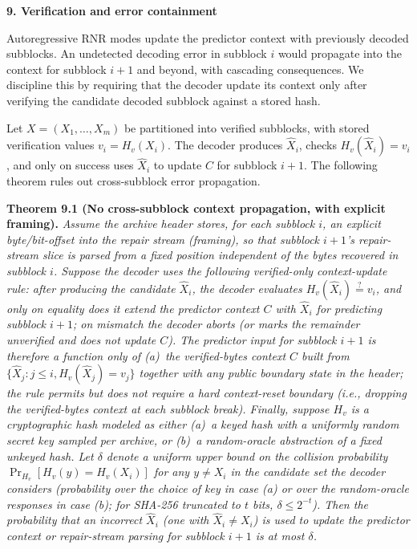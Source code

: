 \documentclass[
]{article}
\begin{document}
\textbf{9. Verification and error containment}

Autoregressive RNR modes update the predictor context with previously
decoded subblocks. An undetected decoding error in subblock $i$ would
propagate into the context for subblock $i + 1$ and beyond, with
cascading consequences. We discipline this by requiring that the
decoder update its context only after verifying the candidate decoded
subblock against a stored hash.

Let $X = (X_1, \ldots, X_m)$ be partitioned into verified subblocks,
with stored verification values $v_i = H_v(X_i)$. The decoder produces
$\hat{X}_i$, checks $H_v(\hat{X}_i) = v_i$, and only on success uses
$\hat{X}_i$ to update $C$ for subblock $i + 1$. The following theorem
rules out cross-subblock error propagation.

\textbf{Theorem 9.1 (No cross-subblock context propagation, with
explicit framing).} \emph{Assume the archive header stores, for each
subblock $i$, an explicit byte/bit-offset into the repair stream
(framing), so that subblock $i + 1$'s repair-stream slice is parsed
from a fixed position independent of the bytes recovered in
subblock $i$. Suppose the decoder uses the following
\emph{verified-only context-update rule}: after producing the
candidate $\hat{X}_i$, the decoder evaluates
$H_v(\hat{X}_i) \stackrel{?}{=} v_i$, and only on equality does it
extend the predictor context $C$ with $\hat{X}_i$ for predicting
subblock $i + 1$; on mismatch the decoder aborts (or marks the
remainder unverified and does not update $C$). The predictor input
for subblock $i+1$ is therefore a function only of (a)~the
verified-bytes context $C$ built from $\{\hat{X}_j : j \leq i,
H_v(\hat{X}_j) = v_j\}$ together with any public boundary state in
the header; the rule permits but does not require a hard
\emph{context-reset boundary} (i.e., dropping the verified-bytes
context at each subblock break). Finally, suppose $H_v$ is a
cryptographic hash modeled as either (a)~a keyed hash with a
uniformly random secret key sampled per archive, or
(b)~a random-oracle abstraction of a fixed unkeyed hash. Let
$\delta$ denote a uniform upper bound on the collision probability
$\Pr_{H_v}[H_v(y) = H_v(X_i)]$ for any $y \neq X_i$ in the
candidate set the decoder considers (probability over the choice of
key in case (a) or over the random-oracle responses in case (b);
for SHA-256 truncated to $t$ bits, $\delta \leq 2^{-t}$). Then the
probability that an incorrect $\hat{X}_i$ (one with $\hat{X}_i \neq
X_i$) is used to update the predictor context or repair-stream
parsing for subblock $i + 1$ is at most $\delta$.}
\end{document}
